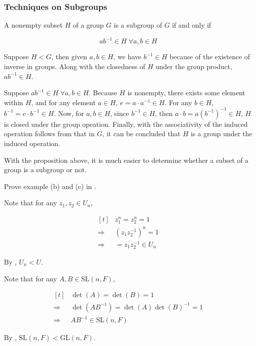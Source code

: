 \documentclass[a4paper,12pt]{article}
\begin{document}
\subsubsection{Techniques on Subgroups}
\begin{pst}
  A nonempty subset $H$ of a group $G$ is a subgroup of $G$ if and only if

  $$ab^{-1}\in H\;\forall a,b\in H$$\s

  \prf {} Suppose $H<G$, then given $a,b\in H$, we have $b^{-1}\in H$ because of the existence of inverse in groups. Along with the closedness of $H$ under the group product, $ab^{-1}\in H$.\n

   Suppose $ab^{-1}\in H\;\forall a,b\in H$. Because $H$ is nonempty, there exists some element within $H$, and for any element $a\in H$, $e=a\cdot a^{-1}\in H$. For any $b\in H$, $b^{-1}=e\cdot b^{-1}\in H$. Now, for $a,b\in H$, since $b^{-1}\in H$, then $a\cdot b=a(b^{-1})^{-1}\in H$, $H$ is closed under the group opeation. Finally, with the associativity of the induced operation follows from that in $G$, it can be concluded that $H$ is a group under the induced operation.
\end{pst}\n

With the proposition above, it is much easier to determine whether a subset of a group is a subgroup or not.

\begin{exm}
  Prove example (b) and (c) in \rexm[\sctd{5}].\n

  \ans {} Note that for any $z_{1},z_{2}\in U_{n}$,

  $$\begin{aligned}[t]
    &z_{1}^{n}=z_{2}^{n}=1\\
    \Rightarrow&(z_{1}z_{2}^{-1})^{n}=1\\
    \Rightarrow&=z_{1}z_{2}^{-1}\in U_{n}
  \end{aligned}$$\s

  By \rpst[\sctd{1}], $U_{n}<U$.\n

   Note that for any $A,B\in\mathrm{SL}(n,F)$,

  $$\begin{aligned}[t]
    &\det(A)=\det(B)=1\\
    \Rightarrow&\det(AB^{-1})=\det(A)\det(B)^{-1}=1\\
    \Rightarrow&AB^{-1}\in\mathrm{SL}(n,F)
  \end{aligned}$$\s

  By \rpst[\sctd{1}], $\mathrm{SL}(n,F)<\mathrm{GL}(n,F)$.
\end{exm}
\end{document}

